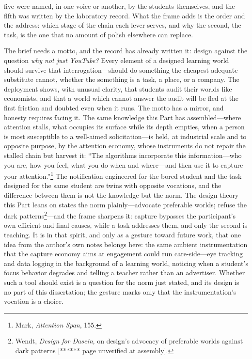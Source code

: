 five were named, in one voice or another, by the students themselves, and the fifth was written by the laboratory record. What the frame adds is the order and the address: which stage of the chain each lever serves, and why the second, the task, is the one that no amount of polish elsewhere can replace.

The brief needs a motto, and the record has already written it: design against the question \textit{why not just YouTube?} Every element of a designed learning world should survive that interrogation---should do something the cheapest adequate substitute cannot, whether the something is a task, a place, or a company. The deployment shows, with unusual clarity, that students audit their worlds like economists, and that a world which cannot answer the audit will be fled at the first friction and doubted even when it runs. The motto has a mirror, and honesty requires facing it. The same knowledge this Part has assembled---where attention stalls, what occupies its surface while its depth empties, when a person is most susceptible to a well-aimed solicitation---is held, at industrial scale and to opposite purpose, by the attention economy, whose instruments do not repair the stalled chain but harvest it: ``The algorithms incorporate this information---who you are, how you feel, what you do when and where---and then use it to capture your attention.''\footnote{Mark, \textit{Attention Span}, 155.} The notification engineered for the bored student and the task designed for the same student are twins with opposite vocations, and the difference between them is not the knowledge but the norm. The design theory this Part leans on states the norm plainly---advocate preferable worlds; refuse the dark patterns\footnote{Wendt, \textit{Design for Dasein}, on design's advocacy of preferable worlds against dark patterns [****** page unverified at assembly].}---and the frame sharpens it: capture bypasses the participant's own efficient and final causes, while a task addresses them, and only the second is teaching. It is in that spirit, and only as a gesture toward future work, that one idea from the author's own notes belongs here: the same ambient instrumentation that the capture economy aims at engagement could run care-side---eye tracking and data logging in the background of a learning world, noticing when a student's focus behavior degrades and telling a teacher rather than an advertiser. Whether such a tool should exist is a question for the norm just stated, and its design is no part of this dissertation; the gesture marks only that the instrumentation's vocation is a choice.

